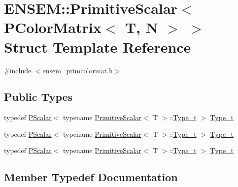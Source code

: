 \hypertarget{structENSEM_1_1PrimitiveScalar_3_01PColorMatrix_3_01T_00_01N_01_4_01_4}{}\section{E\+N\+S\+EM\+:\+:Primitive\+Scalar$<$ P\+Color\+Matrix$<$ T, N $>$ $>$ Struct Template Reference}
\label{structENSEM_1_1PrimitiveScalar_3_01PColorMatrix_3_01T_00_01N_01_4_01_4}


{\ttfamily \#include $<$ensem\+\_\+primcolormat.\+h$>$}

\subsection*{Public Types}
\begin{DoxyCompactItemize}
\item 
typedef \mbox{\hyperlink{classENSEM_1_1PScalar}{P\+Scalar}}$<$ typename \mbox{\hyperlink{structENSEM_1_1PrimitiveScalar}{Primitive\+Scalar}}$<$ T $>$\+::\mbox{\hyperlink{structENSEM_1_1PrimitiveScalar_3_01PColorMatrix_3_01T_00_01N_01_4_01_4_ac43408bdf04ddac58e78326690949cbd}{Type\+\_\+t}} $>$ \mbox{\hyperlink{structENSEM_1_1PrimitiveScalar_3_01PColorMatrix_3_01T_00_01N_01_4_01_4_ac43408bdf04ddac58e78326690949cbd}{Type\+\_\+t}}
\item 
typedef \mbox{\hyperlink{classENSEM_1_1PScalar}{P\+Scalar}}$<$ typename \mbox{\hyperlink{structENSEM_1_1PrimitiveScalar}{Primitive\+Scalar}}$<$ T $>$\+::\mbox{\hyperlink{structENSEM_1_1PrimitiveScalar_3_01PColorMatrix_3_01T_00_01N_01_4_01_4_ac43408bdf04ddac58e78326690949cbd}{Type\+\_\+t}} $>$ \mbox{\hyperlink{structENSEM_1_1PrimitiveScalar_3_01PColorMatrix_3_01T_00_01N_01_4_01_4_ac43408bdf04ddac58e78326690949cbd}{Type\+\_\+t}}
\item 
typedef \mbox{\hyperlink{classENSEM_1_1PScalar}{P\+Scalar}}$<$ typename \mbox{\hyperlink{structENSEM_1_1PrimitiveScalar}{Primitive\+Scalar}}$<$ T $>$\+::\mbox{\hyperlink{structENSEM_1_1PrimitiveScalar_3_01PColorMatrix_3_01T_00_01N_01_4_01_4_ac43408bdf04ddac58e78326690949cbd}{Type\+\_\+t}} $>$ \mbox{\hyperlink{structENSEM_1_1PrimitiveScalar_3_01PColorMatrix_3_01T_00_01N_01_4_01_4_ac43408bdf04ddac58e78326690949cbd}{Type\+\_\+t}}
\end{DoxyCompactItemize}


\subsection{Member Typedef Documentation}
\mbox{\label{structENSEM_1_1PrimitiveScalar_3_01PColorMatrix_3_01T_00_01N_01_4_01_4_ac43408bdf04ddac58e78326690949cbd}} 
